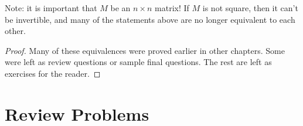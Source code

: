 Note: it is important that \(M\) be an \(n \times n\) matrix! If \(M\) is not square, then it can't be invertible, and many of the statements above are no longer equivalent to each other.
\begin{proof}
Many of these equivalences were proved earlier in other chapters. Some were left as review questions or sample final questions. The rest are left as exercises for the reader.
\end{proof}



\section{Review Problems}

